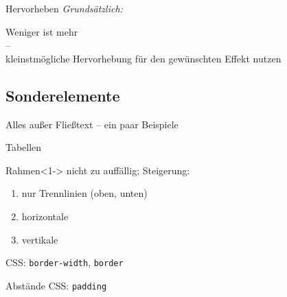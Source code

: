 \documentclass[ngerman,draft, usepdftitle=true]{beamer}
\newcommand*{\code}[1]{\texttt{#1}}
\begin{document}
\begin{frame}{Hervorheben}
\centering
\emph{Grundsätzlich:~}

\vspace*{1.5\baselineskip}
Weniger ist mehr\\ – \\
kleinstmögliche Hervorhebung für den gewünschten Effekt nutzen
\end{frame}


\subsection{Sonderelemente}
\begin{frame}
  \subsectionpage
  \centering
  Alles außer Fließtext – ein paar Beispiele
\end{frame}

\begin{frame}{Tabellen}
  \begin{block}{Rahmen}<1->
    nicht zu auffällig; Steigerung:
    \begin{enumerate}
    \item nur Trennlinien (oben, unten)
    \item horizontale
    \item vertikale
    \end{enumerate}
    CSS: \code{border-width}, \code{border}
  \end{block}
  \begin{block}{Abstände}
    CSS: \code{padding}
  \end{block}
\end{frame}
\end{document}
